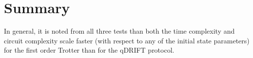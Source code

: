 \documentclass[letterpaper, 11pt]{article}
\begin{document}







\section*{Summary}
In general, it is noted from all three tests than both the time complexity and circuit complexity scale faster (with respect to any of the initial state parameters) for the first order Trotter than for the qDRIFT protocol.
\end{document}
